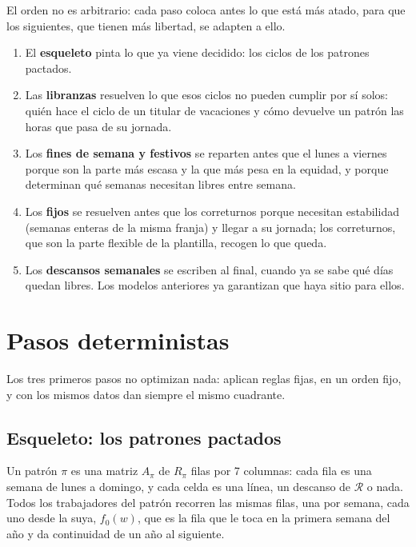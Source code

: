 \documentclass[11pt,a4paper]{article}
\newcommand{\Desc}{\mathcal{R}}
\begin{document}
El orden no es arbitrario: cada paso coloca antes lo que está más atado, para que los
siguientes, que tienen más libertad, se adapten a ello.
\begin{enumerate}[nosep]
  \item El \textbf{esqueleto} pinta lo que ya viene decidido: los ciclos de los patrones
        pactados.
  \item Las \textbf{libranzas} resuelven lo que esos ciclos no pueden cumplir por sí solos: quién
        hace el ciclo de un titular de vacaciones y cómo devuelve un patrón las horas que pasa de
        su jornada.
  \item Los \textbf{fines de semana y festivos} se reparten antes que el lunes a viernes porque
        son la parte más escasa y la que más pesa en la equidad, y porque determinan qué semanas
        necesitan libres entre semana.
  \item Los \textbf{fijos} se resuelven antes que los correturnos porque necesitan estabilidad
        (semanas enteras de la misma franja) y llegar a su jornada; los correturnos, que son la
        parte flexible de la plantilla, recogen lo que queda.
  \item Los \textbf{descansos semanales} se escriben al final, cuando ya se sabe qué días quedan
        libres. Los modelos anteriores ya garantizan que haya sitio para ellos.
\end{enumerate}

\section{Pasos deterministas}

Los tres primeros pasos no optimizan nada: aplican reglas fijas, en un orden fijo, y con los mismos
datos dan siempre el mismo cuadrante.

\subsection{Esqueleto: los patrones pactados}

Un patrón $\pi$ es una matriz $A_\pi$ de $R_\pi$ filas por 7 columnas: cada fila es una semana
de lunes a domingo, y cada celda es una línea, un descanso de $\Desc$ o nada. Todos los
trabajadores del patrón recorren las mismas filas, una por semana, cada uno desde la suya,
$f_0(w)$, que es la fila que le toca en la primera semana del año y da continuidad de un año al
siguiente.
\end{document}
